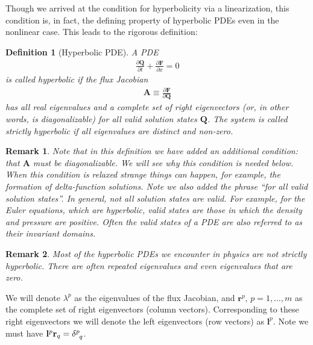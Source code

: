 \documentclass[12pt]{article}
\newtheorem{remark}{Remark}
\newtheorem{definition}{Definition}
\theoremstyle{definition}
\theoremstyle{definition}
\theoremstyle{definition}
\newcommand{\pfrac}[2]{\frac{\partial #1}{\partial #2}}
\newcommand{\mvec}[1]{\mathbf{#1}}
\begin{document}
Though we arrived at the condition for hyperbolicity via a
linearization, this condition is, in fact, the defining property of
hyperbolic PDEs even in the nonlinear case. This leads to the
rigorous definition:

\begin{definition}[Hyperbolic PDE]
  A PDE
  \begin{align*}
    \pfrac{\mvec{Q}}{t} + \pfrac{\mvec{F}}{x} = 0
  \end{align*}
  is called \emph{hyperbolic} if the flux Jacobian
  \begin{align*}
    \mvec{A} \equiv \pfrac{\mvec{F}}{\mvec{Q}}
  \end{align*}
  has all real eigenvalues and a complete set of right eigenvectors
  (or, in other words, is diagonalizable) for all valid solution
  states $\mvec{Q}$. The system is called \emph{strictly hyperbolic}
  if all eigenvalues are distinct and non-zero.
\end{definition}

\begin{remark}
  Note that in this definition we have added an additional condition:
  that $\mvec{A}$ must be diagonalizable. We will see why this
  condition is needed below. When this condition is relaxed strange
  things can happen, for example, the formation of delta-function
  solutions. Note we also added the phrase ``for all valid solution
  states''. In general, not all solution states are valid. For
  example, for the Euler equations, which are hyperbolic, valid states
  are those in which the \emph{density and pressure are
    positive}. Often the valid states of a PDE are also referred to as
  their \emph{invariant domains}.
\end{remark}

\begin{remark}
  Most of the hyperbolic PDEs we encounter in physics are \emph{not}
  strictly hyperbolic. There are often repeated eigenvalues and even
  eigenvalues that are zero.
\end{remark}

We will denote $\lambda^p$ as the eigenvalues of the flux Jacobian,
and $\mvec{r}^p$, $p=1,\ldots,m$ as the complete set of right
eigenvectors (column vectors). Corresponding to these right
eigenvectors we will denote the left eigenvectors (row vectors) as
$\mvec{l}^p$. Note we must have
$\mvec{l}^p \mvec{r}_q = \delta\indices{^p_q}$.
\end{document}
